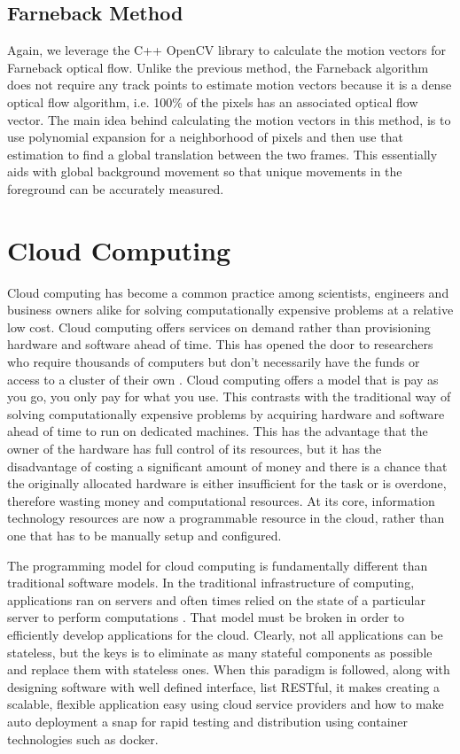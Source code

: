 \subsection{\label{subsection:farneback_method}Farneback Method} Again, we
leverage the C++ OpenCV library to calculate the motion vectors for Farneback
optical flow. Unlike the previous method, the Farneback algorithm does not
require any track points to estimate motion vectors because it is a dense
optical flow algorithm, i.e. 100\% of the pixels has an associated optical flow
vector. The main idea behind calculating the motion vectors in this method, is
to use polynomial expansion for a neighborhood of pixels \cite{farneback2003two}
and then use that estimation to find a global translation between the two
frames. This essentially aids with global background movement so that unique
movements in the foreground can be accurately measured.

\section{\label{section:cloud_computing}Cloud Computing}
Cloud computing has become a common practice among scientists, engineers and
business owners alike for solving computationally expensive problems at a
relative low cost. Cloud computing offers services on demand rather than
provisioning hardware and software ahead of time. This has opened the door to
researchers who require thousands of computers but don't necessarily have the
funds or access to a cluster of their own \cite{armbrust2009above}. Cloud
computing offers a model that is pay as you go, you only pay for what you use.
This contrasts with the traditional way of solving computationally expensive
problems by acquiring hardware and software ahead of time to run on dedicated
machines. This has the advantage that the owner of the hardware has full control
of its resources, but it has the disadvantage of costing a significant amount of
money and there is a chance that the originally allocated hardware is  either
insufficient for the task or is overdone,  therefore wasting money and
computational resources.  At its core, information technology resources are now
a programmable resource in the cloud, rather than one that has to be manually
setup and configured.

The programming model for cloud computing is fundamentally different than
traditional software models. In the traditional infrastructure of computing,
applications ran on servers and often times relied on the state of a particular
server to perform computations \cite{awsbestpractices}. That model must be
broken in order to efficiently develop applications for the cloud. Clearly, not
all applications can be stateless, but the keys is to eliminate as many stateful
components as possible and replace them with stateless ones. When this paradigm
is followed, along with designing software with well defined interface, list
RESTful, it makes creating a scalable, flexible application easy using cloud
service providers \cite{awsbestpractices} and how to make auto deployment a snap
for rapid testing and distribution using container technologies such as docker.

